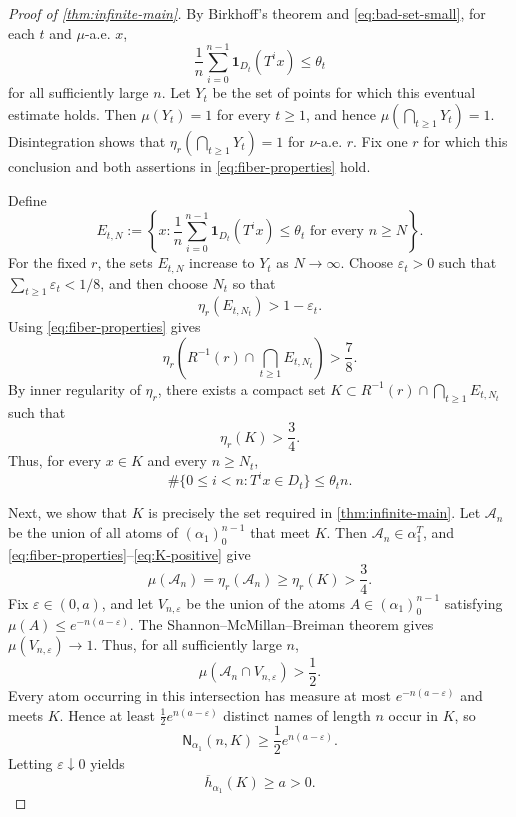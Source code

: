 \documentclass[12pt,letterpaper,reqno]{amsart}
\newcommand{\cA}{\mathcal A}
\newcommand{\Nname}{\mathsf N}
\theoremstyle{definition}
\theoremstyle{remark}
\numberwithin{equation}{section}
\begin{document}
\begin{proof}[Proof of \cref{thm:infinite-main}]
		By Birkhoff's theorem and \eqref{eq:bad-set-small}, for each $t$ and
		$\mu$-a.e. $x$,
		\[
		\frac1n\sum_{i=0}^{n-1}\mathbf1_{D_t}(T^ix)\leq\theta_t
		\]
		for all sufficiently large $n$.  Let $Y_t$ be the set of points for which
		this eventual estimate holds.  Then $\mu(Y_t)=1$ for every $t \geq 1$, and hence
		$\mu(\bigcap_{t\geq 1} Y_t)=1$.  Disintegration shows that
		$\eta_r(\bigcap_{t\geq1}Y_t)=1$ for $\nu$-a.e. $r$.  Fix one $r$ for which
		this conclusion and both assertions in \eqref{eq:fiber-properties} hold.
		
		Define
		\[
		E_{t,N}
		:=
		\left\{
		x:
		\frac1n\sum_{i=0}^{n-1}\mathbf1_{D_t}(T^ix)
		\leq\theta_t
		\text{ for every }n\geq N
		\right\}.
		\]
		For the fixed $r$, the sets $E_{t,N}$ increase to $Y_t$ as $N\to\infty$.
		Choose $\varepsilon_t>0$ such that
		$\sum_{t\geq1}\varepsilon_t<1/8$, and then choose $N_t$ so that
		\[
		\eta_r(E_{t,N_t})>1-\varepsilon_t.
		\]
		Using \eqref{eq:fiber-properties} gives
		\[
		\eta_r\left(
		R^{-1}(r)\cap\bigcap_{t\geq1}E_{t,N_t}
		\right)
		>\frac78.
		\]
		By inner regularity of
		$\eta_r$, there exists a compact set $K \subset R^{-1}(r)\cap\bigcap_{t\geq1}E_{t,N_t}$ such that
		\begin{equation}
			\eta_r(K)>\frac34.
			\label{eq:K-positive}
		\end{equation}
		Thus, for every $x\in K$ and every $n\geq N_t$,
		\begin{equation}
			\#\{0\leq i<n:T^ix\in D_t\}
			\leq\theta_tn.
			\label{eq:uniform-bad-frequency}
		\end{equation}
		
		
		Next, we show that $K$ is precisely the set required in \cref{thm:infinite-main}. Let
		$\cA_n$ be the union of all atoms of $(\alpha_1)_0^{n-1}$ that meet
		$K$. Then $\cA_n\in\alpha_1^T$, and
		\eqref{eq:fiber-properties}--\eqref{eq:K-positive} give
		\begin{equation}
			\mu(\cA_n)=\eta_r(\cA_n)\geq\eta_r(K)>\frac34.
			\label{eq:A-large}
		\end{equation}
		Fix $\varepsilon\in(0,a)$, and let $V_{n,\varepsilon}$ be the union of the
		atoms $A\in(\alpha_1)_0^{n-1}$ satisfying
		$\mu(A)\leq e^{-n(a-\varepsilon)}$.  The
		Shannon--McMillan--Breiman theorem gives
		$\mu(V_{n,\varepsilon})\to1$.  Thus, for all sufficiently large $n$,
		\[
		\mu(\cA_n\cap V_{n,\varepsilon})
		>\frac12.
		\]
		Every atom occurring in this intersection has measure at most
		$e^{-n(a-\varepsilon)}$ and meets $K$.  Hence at least
		$\frac12e^{n(a-\varepsilon)}$ distinct names of length $n$ occur in $K$, so
		\[
		\Nname_{\alpha_1}(n,K)
		\geq\frac12e^{n(a-\varepsilon)}.
		\]
		Letting $\varepsilon\downarrow0$ yields
		\begin{equation}
			\overline h_{\alpha_1}(K)\geq a>0.
			\label{eq:K-positive-name-entropy}
		\end{equation}
		

\end{proof}
\end{document}
